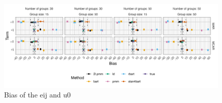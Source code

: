 \documentclass[10pt, a4paper, titlepage]{article}
\begin{document}




\begin{figure}[H]
    \centering
    \includegraphics[width=1\textwidth]{bias2.png}
    \caption{Bias of the eij and u0}
    \label{fig:bias2}
\end{figure}
\end{document}
